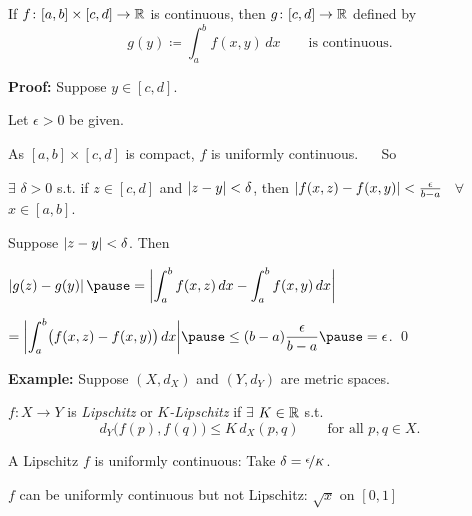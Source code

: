 \documentclass[10pt,aspectratio=149]{beamer}
\begin{document}
\begin{frame}

\begin{proposition}
If $f \colon [a,b] \times [c,d] \to {\mathbb{R}}$ is continuous,
then $g \colon [c,d] \to {\mathbb{R}}$ defined by
\begin{equation*}
g(y) \coloneqq \int_a^b f(x,y) \,dx  \qquad \text{is continuous}.
\end{equation*}
\end{proposition}

\pause
\textbf{Proof:}
Suppose $y \in [c,d]$.

\pause
\medskip

Let $\epsilon > 0$ be given.

\pause
\medskip

As $[a,b] \times [c,d]$ is compact, $f$
is uniformly continuous.
\pause
~~ So

$\exists$ $\delta > 0$ s.t.
if $z \in [c,d]$ and
$\left\lvert {z-y} \right\rvert < \delta$, then
$\left\lvert {f(x,z)-f(x,y)} \right\rvert < \frac{\epsilon}{b-a}$ ~$\forall$ $x \in [a,b]$.

\pause
\medskip

Suppose $\left\lvert {z-y} \right\rvert < \delta$.
\pause
Then

\medskip

$\displaystyle
\abs{
g(z)-
g(y)
}
\pause
=
\bbabs{
\int_a^b 
f(x,z) \,dx 
-
\int_a^b 
f(x,y) \,dx 
}$

\pause
\medskip

\hfill
\hfill
\hfill
$\displaystyle
=
\bbabs{
\int_a^b 
\bigl(
f(x,z) - f(x,y)
\bigr)
\,dx 
}
\pause
\leq
(b-a)
\frac{\epsilon}{b-a}
\pause
= \epsilon$.
\qed

\end{frame}

\begin{frame}

\textbf{Example:}
Suppose $(X,d_X)$ and $(Y,d_Y)$ are metric spaces.

\pause
\medskip


$f \colon X \to Y$ is \emph{Lipschitz} or \emph{$K$-Lipschitz} if $\exists$
$K \in {\mathbb{R}}$ s.t.
\[
d_Y\bigl(f(p),f(q)\bigr) \leq K\, d_X(p,q)
\qquad \text{for all } p,q \in X.
\]

\pause
A Lipschitz $f$ is uniformly continuous:
\pause
Take $\delta = \nicefrac{\epsilon}{K}$.

\pause
\medskip

$f$ can be uniformly continuous but not Lipschitz:
\pause
$\sqrt{x}$ on $[0,1]$

\end{frame}
\end{document}
